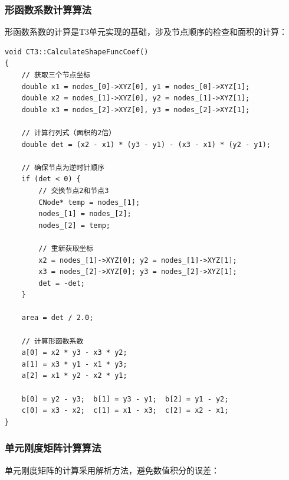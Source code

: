 \documentclass[12pt,a4paper]{article}
\begin{document}
\subsubsection{形函数系数计算算法}

形函数系数的计算是T3单元实现的基础，涉及节点顺序的检查和面积的计算：

\begin{lstlisting}[caption=形函数系数计算实现]
void CT3::CalculateShapeFuncCoef()
{
    // 获取三个节点坐标
    double x1 = nodes_[0]->XYZ[0], y1 = nodes_[0]->XYZ[1];
    double x2 = nodes_[1]->XYZ[0], y2 = nodes_[1]->XYZ[1];
    double x3 = nodes_[2]->XYZ[0], y3 = nodes_[2]->XYZ[1];
    
    // 计算行列式（面积的2倍）
    double det = (x2 - x1) * (y3 - y1) - (x3 - x1) * (y2 - y1);
    
    // 确保节点为逆时针顺序
    if (det < 0) {
        // 交换节点2和节点3
        CNode* temp = nodes_[1];
        nodes_[1] = nodes_[2];
        nodes_[2] = temp;
        
        // 重新获取坐标
        x2 = nodes_[1]->XYZ[0]; y2 = nodes_[1]->XYZ[1];
        x3 = nodes_[2]->XYZ[0]; y3 = nodes_[2]->XYZ[1];
        det = -det;
    }
    
    area = det / 2.0;
    
    // 计算形函数系数
    a[0] = x2 * y3 - x3 * y2;
    a[1] = x3 * y1 - x1 * y3;
    a[2] = x1 * y2 - x2 * y1;
    
    b[0] = y2 - y3;  b[1] = y3 - y1;  b[2] = y1 - y2;
    c[0] = x3 - x2;  c[1] = x1 - x3;  c[2] = x2 - x1;
}
\end{lstlisting}

\subsubsection{单元刚度矩阵计算算法}

单元刚度矩阵的计算采用解析方法，避免数值积分的误差：
\end{document}
